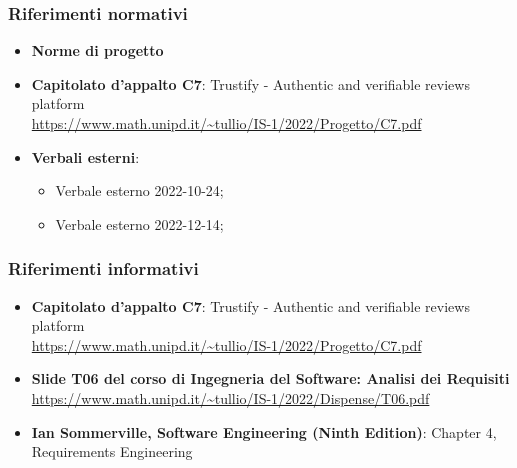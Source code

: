     \subsubsection{Riferimenti normativi}
        \begin{itemize}
            \item \textbf{Norme di progetto}
            \item \textbf{Capitolato d'appalto C7}: Trustify - Authentic and verifiable reviews platform \\
            \url{https://www.math.unipd.it/~tullio/IS-1/2022/Progetto/C7.pdf}
            \item \textbf{Verbali esterni}:
            \begin{itemize}
                \item Verbale esterno 2022-10-24;
                \item Verbale esterno 2022-12-14;
            \end{itemize}
        \end{itemize}
    \subsubsection{Riferimenti informativi}
    \begin{itemize}
        \item \textbf{Capitolato d'appalto C7}: Trustify - Authentic and verifiable reviews platform \\
        \url{https://www.math.unipd.it/~tullio/IS-1/2022/Progetto/C7.pdf}
        \item \textbf{Slide T06 del corso di Ingegneria del Software: Analisi dei Requisiti} \\ \url{https://www.math.unipd.it/~tullio/IS-1/2022/Dispense/T06.pdf}
        \item \textbf{Ian Sommerville, Software Engineering (Ninth Edition)}: Chapter 4, Requirements Engineering
    \end{itemize}